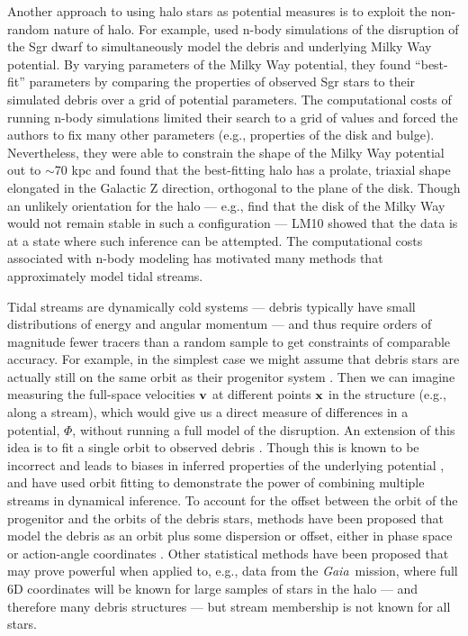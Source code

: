 \documentclass[letterpaper,12pt,preprint]{aastex}
\newcommand{\project}[1]{\textsl{#1}}
\newcommand{\gaia}{\project{Gaia}}
\begin{document}
Another approach to using halo stars as potential measures is to exploit the non-random nature of halo. For example, \citet[][LM10]{law10} used n-body simulations of the disruption of the Sgr dwarf to simultaneously model the debris and underlying Milky Way potential. By varying parameters of the Milky Way potential, they found ``best-fit'' parameters by comparing the properties of observed Sgr stars to their simulated debris over a grid of potential parameters. The computational costs of running n-body simulations limited their search to a grid of values and forced the authors to fix many other parameters (e.g., properties of the disk and bulge). Nevertheless, they were able to constrain the shape of the Milky Way potential out to $\sim$70 kpc and found that the best-fitting halo has a prolate, triaxial shape elongated in the Galactic Z direction, orthogonal to the plane of the disk. Though an unlikely orientation for the halo --- e.g., \cite{debattista13} find that the disk of the Milky Way would not remain stable in such a configuration --- LM10 showed that the data is at a state where such inference can be attempted. The computational costs associated with n-body modeling has motivated many methods that approximately model tidal streams.

Tidal streams are dynamically cold systems --- debris typically have small distributions of energy and angular momentum --- and thus require orders of magnitude fewer tracers than a random sample to get constraints of comparable accuracy. For example, in the simplest case we might assume that debris stars are actually still on the same orbit as their progenitor system \citep[a \emph{wrong} assumption, see e.g.,][]{eyre11}. Then we can imagine measuring the full-space velocities ${\bf v}$ at different points ${\bf x}$ in the structure (e.g., along a stream), which would give us a direct measure of differences in a potential, $\Phi$, without running a full model of the disruption. An extension of this idea is to fit a single orbit to observed debris \citep[e.g.,][]{koposov10, deg13}. Though this is known to be incorrect and leads to biases in inferred properties of the underlying potential \citep[e.g.,][]{eyre11, lux13, sanders13a}, \cite{deg14} and \cite{lux13} have used orbit fitting to demonstrate the power of combining multiple streams in dynamical inference. To account for the offset between the orbit of the progenitor and the orbits of the debris stars, methods have been proposed that model the debris as an orbit plus some dispersion or offset, either in phase space \citep[e.g.,][]{eyre09a, varghese11, kuepper12} or action-angle coordinates \citep{eyre11, sanders13b, bovy14, sanders14}. Other statistical methods have been proposed \citep[][]{penarrubia12, sanderson14} that may prove powerful when applied to, e.g., data from the \gaia\, mission, where full 6D coordinates will be known for large samples of stars in the halo --- and therefore many debris structures --- but stream membership is not known for all stars.
\end{document}
